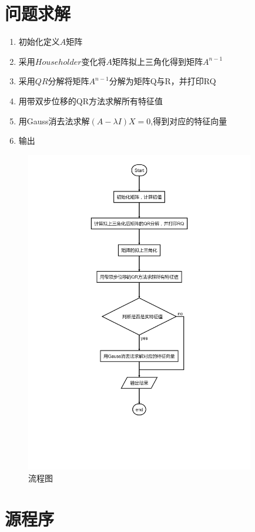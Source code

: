 \chapter{问题求解}
\begin{enumerate}
\item 初始化定义$A$矩阵

\item 采用$Householder$变化将$A$矩阵拟上三角化得到矩阵$A^{n-1}$

\item 采用$QR$分解将矩阵$A^{n-1}$分解为矩阵Q与R，并打印RQ

\item 用带双步位移的QR方法求解所有特征值

\item 用Gauss消去法求解$(A-\lambda I)X=0$,得到对应的特征向量

\item 输出
\end{enumerate}
\newpage
\begin{figure}[ht]
\small
\centering
\includegraphics[width=10cm]{2.pdf}
\caption{流程图} \label{fig:1}
\end{figure}

\chapter{源程序}
